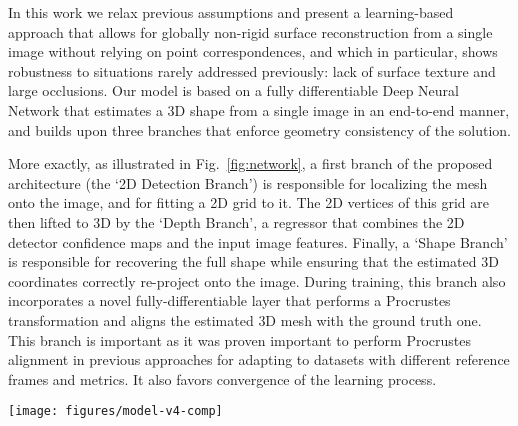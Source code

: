 \documentclass[10pt,twocolumn,letterpaper]{article}
\begin{document}
In this work we relax previous assumptions and present a learning-based approach that allows for globally non-rigid surface reconstruction from a single image without relying on point correspondences, and which in particular, shows robustness to situations rarely addressed previously: lack of surface texture and large occlusions. Our model is based on a fully differentiable Deep Neural Network that estimates a 3D shape from a single image in an end-to-end manner, and builds upon three branches that enforce geometry consistency of the solution. 


More exactly, as illustrated in Fig.~\ref{fig:network}, a first branch of the proposed architecture (the `2D Detection Branch') is responsible for localizing the mesh onto the image, and for fitting a 2D grid to it. The 2D vertices of this grid are then lifted to 3D by the `Depth Branch', a regressor that combines the 2D detector confidence maps and the input image features. Finally, a `Shape Branch' is responsible for recovering the full shape while ensuring that the estimated 3D coordinates correctly re-project onto the image. During training, this branch also incorporates a novel fully-differentiable layer that performs a Procrustes transformation and aligns the estimated 3D mesh with the ground truth one. This branch is important as it was proven important to perform Procrustes alignment in previous approaches for adapting to datasets with different reference frames and metrics. It also favors convergence of the learning process. 

\begin{figure*}[t!]
	\centering
	\texttt{[image: figures/model-v4-comp]}
	\caption{{\bf Overview of our approach.} The proposed architecture consists of three main branches. The `2D Detection Branch' is responsible for the 2D location of the mesh and the associated belief maps. The `Depth Branch' lifts the 2D detected mesh by leveraging on image cues and the detection uncertainties. Finally, the `Shape Branch' fuses the 2D detections and their estimated depths to obtain 3D shape in such a way  that perspective projection is enforced. An additional `Procrustes Layer' is used during training to align the estimated mesh with the ground truth one.}
	\label{fig:network}
\end{figure*}
 
\end{document}
